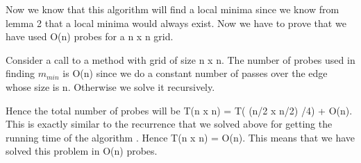\documentclass[12pt]{article}
\begin{document}
Now we know that this algorithm will find a local minima since we know from lemma 2 that a local minima would always exist. Now we have to prove that we have used O(n) probes for a n x n grid.

Consider a call to a method with grid of size n x n. The number of probes used in finding $m_{min}$ is O(n) since we do a constant number of passes over the edge whose size is n. Otherwise we solve it recursively.

Hence the total number of probes will be T(n x n) = T( (n/2 x n/2) /4) + O(n).\\
This is exactly similar to the recurrence that we solved above for getting the running time of the algorithm . Hence T(n x n) = O(n). This means that we have solved this problem in O(n) probes.
\end{document}
